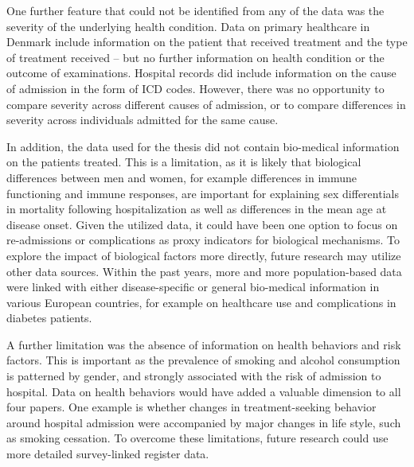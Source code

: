 One further feature that could not be identified from any of the data was 
the severity of the underlying health condition. Data on primary healthcare 
in Denmark include information on the patient that received treatment and 
the type of treatment received -- but no further information on health condition 
or the outcome of examinations.\citep{sahl2011danish} Hospital records did 
include information on the cause of admission in the form of ICD codes. 
However, there was no opportunity to compare severity across different causes 
of admission, or to compare differences in severity across individuals admitted 
for the same cause.

In addition, the data used for the thesis did not contain bio-medical 
information on the patients treated. This is a limitation, as it is likely 
that biological differences between men and women, for example differences 
in immune functioning and immune responses, are important for explaining sex 
differentials in mortality following hospitalization as well as differences 
in the mean age at disease onset.\citep{case2005sex,bouman2005sex,oertelt2012influence} 
Given the utilized data, it could have been one option to focus on re-admissions 
or complications as proxy indicators for biological mechanisms.\citep{hahnel2009re,
hannan201130,merkow2015underlying,ma2018prevalence} To explore the impact of 
biological factors more directly, future research may utilize other data 
sources. Within the past years, more and more population-based data were 
linked with either disease-specific or general bio-medical information in 
various European countries,\citep{volzke2011cohort,walldius2017cohort,
borodulin2017cohort} for example on healthcare use and complications in 
diabetes patients.\citep{akbar2017cohort}

A further limitation was the absence of information on health behaviors and 
risk factors. This is important as the prevalence of smoking and alcohol 
consumption is patterned by gender, and strongly associated with the risk 
of admission to hospital.\citep{syddall2016understanding,hanlon1998hospital,
hanlon2000link,hanlon2007analysis} Data on health behaviors would have added 
a valuable dimension to all four papers. One example is whether changes in 
treatment-seeking behavior around hospital admission were accompanied by major 
changes in life style, such as smoking cessation. To overcome these limitations, 
future research could use more detailed survey-linked register data. 

